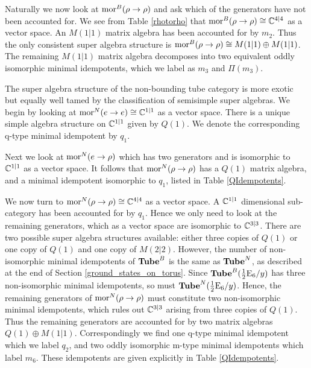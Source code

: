 Naturally we now look at $\text{mor}^B(\rho \to \rho)$ and ask which of the generators have not been accounted for. 
We see from Table \ref{rhotorho} that $\text{mor}^B(\rho \to \rho) \cong \mathbb{C}^{4|4}$ as a vector space. 
An $M(1|1)$ matrix algebra has been accounted for by $m_2$. 
Thus the only consistent super algebra structure is $\text{mor}^B(\rho \to \rho) \cong M(1|1) \oplus M(1|1)$.
The remaining $M(1|1)$ matrix algebra decomposes into two equivalent oddly isomorphic minimal idempotents, 
which we label as $m_3$ and $\Pi(m_3)$.


The super algebra structure of the non-bounding tube category is more exotic but equally well tamed by the classification of semisimple super algebras.
We begin by looking at $\text{mor}^N(e\to e) \cong \mathbb{C}^{1|1}$ as a vector space. 
There is a unique simple algebra structure on $\mathbb{C}^{1|1}$ given by $Q(1)$. 
We denote the corresponding q-type minimal idempotent by $q_1$.

Next we look at $\text{mor}^N(e \to \rho)$ which has two generators and is isomorphic to $\mathbb{C}^{1|1}$ as a vector space. 
It follows that $\text{mor}^N(\rho \to \rho)$ has a $Q(1)$ matrix algebra, 
and a minimal idempotent isomorphic to $q_1$, listed in Table \ref{QIdempotents}. 

We now turn to $\text{mor}^N(\rho \to \rho) \cong \mathbb{C}^{4|4}$ as a vector space. 
A $\mathbb{C}^{1|1}$ dimensional sub-category has been accounted for by $q_1$. 
Hence we only need to look at the remaining generators, which as a vector space are isomorphic to $\mathbb{C}^{3|3}$.
There are two possible super algebra structures available: either three copies of $Q(1)$ or one copy of $Q(1)$ and one copy of $M(2|2)$.
However, the number of non-isomorphic minimal idempotents of $\textbf{Tube}^B$ is the same as $\textbf{Tube}^N$, 
as described at the end of Section \ref{ground_states_on_torus}. 
Since $\textbf{Tube}^B(\frac{1}{2}\text{E}_6/y)$ has three non-isomorphic minimal idempotents, 
so must $\textbf{Tube}^N(\frac{1}{2}\text{E}_6/y)$. 
Hence, the remaining generators of $\text{mor}^N(\rho \to \rho)$ 
must constitute two non-isomorphic minimal idempotents, 
which  rules out $\mathbb{C}^{3|3}$ arising from three copies of $Q(1)$.
Thus the remaining generators are accounted for by two matrix algebras $Q(1) \oplus M(1|1)$.
Correspondingly we find one q-type minimal idempotent which we label $q_2$, 
and two oddly isomorphic m-type minimal idempotents which label $m_6$.
These idempotents are given explicitly in Table \ref{QIdempotents}.

